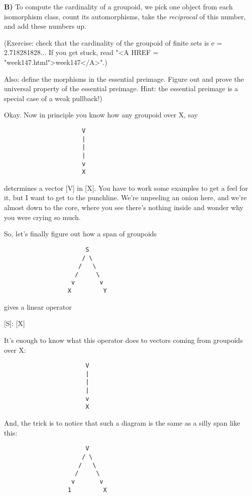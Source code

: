 \textbf{B)} To compute the cardinality of a groupoid, we pick one object
from each isomorphism class, count its automorphisms, take the 
\emph{reciprocal} of this number, and add these numbers up.

(Exercise: check that the cardinality of the groupoid of finite
sets is e = 2.718281828...  If you get stuck, read "<A HREF = "week147.html">week147</A>".)

Also: define the morphisms in the essential preimage.  Figure out 
and prove the universal property of the essential preimage.  Hint: 
the essential preimage is a special case of a weak pullback!)

Okay.  Now in principle you know how any groupoid over X, say

\begin{verbatim}
                      V
                      |
                      |
                      |
                      v
                      X
\end{verbatim}
    
determines a vector [V] in [X].  You have to work some examples
to get a feel for it, but I want to get to the punchline.  We're 
unpeeling an onion here, and we're almost down to the core, where 
you see there's nothing inside and wonder why you were crying so much.

So, let's finally figure out how a span of groupoids

\begin{verbatim}
                       S
                      / \
                     /   \
                    /     \
                   v       v
                  X         Y
\end{verbatim}
    
gives a linear operator 

[S]: [X] \to  [Y] 

It's enough to know what this operator does to vectors 
coming from groupoids over X:

\begin{verbatim}
                       V
                       |
                       |
                       |
                       v
                       X
\end{verbatim}
    
And, the trick is to notice that such a diagram is the same as
a silly span like this:

\begin{verbatim}
                       V
                      / \
                     /   \
                    /     \
                   v       v
                  1         X
\end{verbatim}
    
